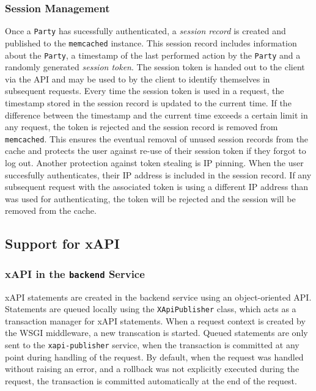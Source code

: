 \documentclass[a4paper,11pt]{article}
\def\inline{\lstinline[basicstyle=\ttfamily,keywordstyle={}]}
\begin{document}
            \subsubsection{Session Management}
                Once a \inline{Party} has sucessfully authenticated, a \textit{session record}
                is created and published to the \inline{memcached} instance.
                This session record includes information about the
                \inline{Party}, a timestamp of the last performed action by the \inline{Party}
                and a randomly generated \textit{session token}.
                The session token is handed out to the client via the API
                and may be used to by the client to identify themselves
                in subsequent requests. Every time the session token is used
                in a request, the timestamp stored in the session record is
                updated to the current time. If the difference between
                the timestamp and the current time exceeds a certain limit
                in any request, the token is rejected and the session record
                is removed from \inline{memcached}. This ensures the eventual
                removal of unused session records from the cache and protects
                the user against re-use of their session token if they forgot
                to log out. Another protection against token stealing
                is IP pinning. When the user succesfully authenticates,
                their IP address is included in the session record.
                If any subsequent request with the associated token
                is using a different IP address than was used for authenticating,
                the token will be rejected and the session will be removed
                from the cache.

        \subsection{Support for xAPI}
            \subsubsection{xAPI in the \inline{backend} Service}
                xAPI statements are created in the backend service using an
                object-oriented API. Statements are queued locally using
                the \inline{XApiPublisher} class, which acts as a transaction manager
                for xAPI statements. When a request context is created by the
                WSGI middleware, a new transcation is started. 
                Queued statements are only sent to the \inline{xapi-publisher} service, 
                when the transaction is committed at any point during handling 
                of the request. By default, when the request was handled
                without raising an error, and a rollback was not explicitly
                executed during the request, the transaction is committed automatically
                at the end of the request.
\end{document}
